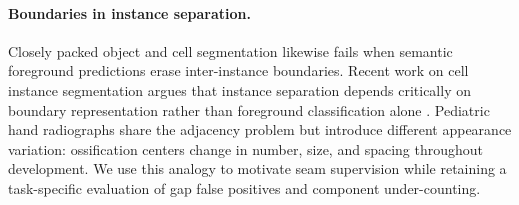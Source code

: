 \paragraph{Boundaries in instance separation.}
Closely packed object and cell segmentation likewise fails when semantic foreground predictions erase inter-instance boundaries. Recent work on cell instance segmentation argues that instance separation depends critically on boundary representation rather than foreground classification alone \citep{liang2025boundaries}. Pediatric hand radiographs share the adjacency problem but introduce different appearance variation: ossification centers change in number, size, and spacing throughout development. We use this analogy to motivate seam supervision while retaining a task-specific evaluation of gap false positives and component under-counting.
